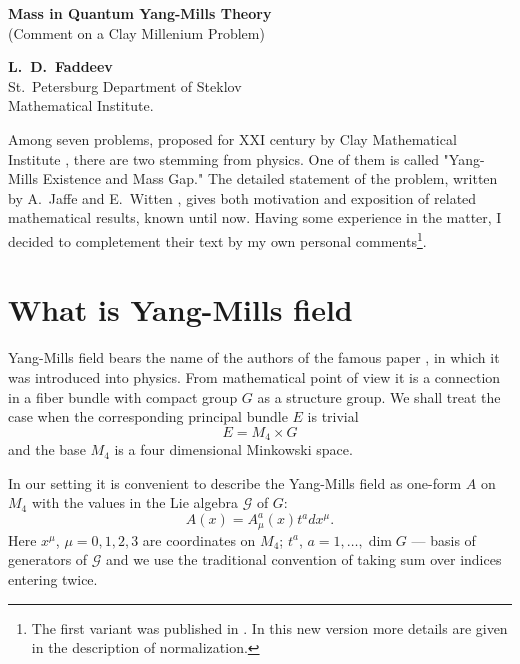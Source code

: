 \documentclass[12pt]{article}
\newcommand{\MM}{M}
\newcommand{\GG}{G}
\newcommand{\EE}{E}
\newcommand{\JJ} {\mathcal{G}}
\begin{document}

\begin{center}
{
\bf \large Mass in Quantum Yang-Mills Theory  \\
}
(Comment on a Clay Millenium Problem)\\

\vskip 0.3cm

{\bf L.~D.~Faddeev } \\
St.~Petersburg Department of Steklov \\
Mathematical Institute.
\end{center}


	Among seven problems, proposed for XXI century by Clay 
	Mathematical Institute
\cite{clay},
	there are two stemming from physics. One of them is 
	called 
	"Yang-Mills Existence and Mass Gap."
	The detailed statement of the problem, written by
	A.~Jaffe and E.~Witten
\cite{JW},
	gives both motivation and exposition of related mathematical
	results, known until now.
	Having some experience in the matter, I decided to 
	completement their text	by my own personal 
comments\footnote{The first variant was published in 
\cite{comment}.
In this new version more details are given in the description
of normalization.}. 

\section{What is Yang-Mills field}
	Yang-Mills field bears the name of the authors of the
	famous paper
\cite{YM},
	in which it was introduced into physics. From mathematical
	point of view it is a connection in a fiber bundle with
	compact group
    $ \GG $
	as a structure group. We shall treat the case when the 
	corresponding principal bundle
    $ \EE $
	is trivial
\begin{equation*}
	\EE = \MM_{4} \times \GG
\end{equation*}
	and the base
    $ \MM_{4} $
	is a four dimensional Minkowski space.

	In our setting it is convenient to describe the Yang-Mills 
	field as one-form
    $ A $
	on
    $ \MM_{4} $
	with the values in the Lie algebra
    $ \JJ $
	of
    $ \GG $:
\begin{equation*}
        A(x) = A^{a}_{\mu} (x) t^{a} dx^{\mu}.
\end{equation*}
	Here
    $ x^{\mu} $, 
    $ \mu = 0,1,2,3 $ 
	are coordinates on
    $ \MM_{4} $;
    $ t^{a} $,
    $ a = 1, \ldots , \dim G $ ---
	basis of generators of
    $ \JJ $
	and we use the traditional convention of taking sum over
	indices entering twice.
\end{document}
